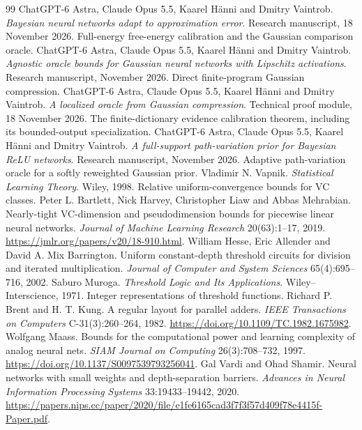 \documentclass[11pt]{article}
\begin{document}




\begin{thebibliography}{99}
 ChatGPT-6 Astra, Claude Opus 5.5, Kaarel H\"anni and Dmitry Vaintrob. \emph{Bayesian neural networks adapt to approximation error}. Research manuscript, 18 November 2026. Full-energy free-energy calibration and the Gaussian comparison oracle.
 ChatGPT-6 Astra, Claude Opus 5.5, Kaarel H\"anni and Dmitry Vaintrob. \emph{Agnostic oracle bounds for Gaussian neural networks with Lipschitz activations}. Research manuscript, November 2026. Direct finite-program Gaussian compression.
 ChatGPT-6 Astra, Claude Opus 5.5, Kaarel H\"anni and Dmitry Vaintrob. \emph{A localized oracle from Gaussian compression}. Technical proof module, 18 November 2026. The finite-dictionary evidence calibration theorem, including its bounded-output specialization.
 ChatGPT-6 Astra, Claude Opus 5.5, Kaarel H\"anni and Dmitry Vaintrob. \emph{A full-support path-variation prior for Bayesian ReLU networks}. Research manuscript, November 2026. Adaptive path-variation oracle for a softly reweighted Gaussian prior.
 Vladimir N. Vapnik. \emph{Statistical Learning Theory}. Wiley, 1998. Relative uniform-convergence bounds for VC classes.
 Peter L. Bartlett, Nick Harvey, Christopher Liaw and Abbas Mehrabian. Nearly-tight VC-dimension and pseudodimension bounds for piecewise linear neural networks. \emph{Journal of Machine Learning Research} 20(63):1--17, 2019. \url{https://jmlr.org/papers/v20/18-910.html}.
 William Hesse, Eric Allender and David A. Mix Barrington. Uniform constant-depth threshold circuits for division and iterated multiplication. \emph{Journal of Computer and System Sciences} 65(4):695--716, 2002.
 Saburo Muroga. \emph{Threshold Logic and Its Applications}. Wiley--Interscience, 1971. Integer representations of threshold functions.
 Richard P. Brent and H. T. Kung. A regular layout for parallel adders. \emph{IEEE Transactions on Computers} C-31(3):260--264, 1982. \url{https://doi.org/10.1109/TC.1982.1675982}.
 Wolfgang Maass. Bounds for the computational power and learning complexity of analog neural nets. \emph{SIAM Journal on Computing} 26(3):708--732, 1997. \url{https://doi.org/10.1137/S0097539793256041}.
 Gal Vardi and Ohad Shamir. Neural networks with small weights and depth-separation barriers. \emph{Advances in Neural Information Processing Systems} 33:19433--19442, 2020. \url{https://papers.nips.cc/paper/2020/file/e1fe6165cad3f7f3f57d409f78e4415f-Paper.pdf}.
\end{thebibliography}
\end{document}
